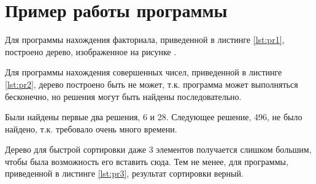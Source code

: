 \section{Пример работы программы}
Для программы нахождения факториала, приведенной в листинге \ref{lst:pr1}, построено дерево, изображенное на рисунке .

\begin{figure}[H]
\end{figure}

Для программы нахождения совершенных чисел, приведенной в листинге \ref{lst:pr2}, дерево построено быть не может, т.к. программа может выполняться бесконечно, но решения могут быть найдены последовательно.

Были найдены первые два решения, 6 и 28. Следующее решение, 496, не было найдено, т.к. требовало очень много времени.
 
Дерево для быстрой сортировки даже 3 элементов получается слишком большим, чтобы была возможность его вставить сюда. Тем не менее, для программы, приведенной в листинге \ref{lst:pr3}, результат сортировки верный.
